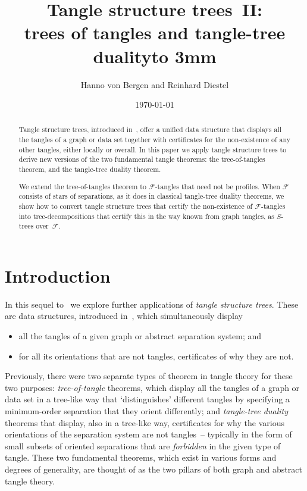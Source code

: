 \documentclass[reqno]{amsart}
\title{Tangle structure trees~II:\\ trees of tangles and tangle-tree duality\hbox to 3mm{\hfil}}
\author{Hanno von Bergen and Reinhard Diestel}
\date{\today}
\newcommand{\F}{\mathcal{F}}
\theoremstyle{definition}
\def\COMMENT{}
\def\td{tree-decom\-pos\-ition}
\begin{document}
\maketitle

\begin{abstract}
Tangle structure trees, introduced in~\cite{TSTs}, offer a unified data structure that displays all the tangles of a graph or data set together with certificates for the non-existence of any other tangles, either locally%
   \COMMENT{}
   or overall. In this paper we apply tangle structure trees to derive new versions of the two fundamental tangle theorems: the tree-of-tangles theorem, and the tangle-tree duality theorem.

We extend the tree-of-tangles theorem to $\F$-tangles that need not be profiles. When $\F$ consists of stars of separations, as it does in classical tangle-tree duality theorems, we show how to convert tangle structure trees that certify the non-existence of $\F$-tangles into \td s that certify this in the way known from graph tangles, as $S$-trees over~$\F$.
\end{abstract}

\medskip\section{Introduction}

\noindent
   In this sequel to~\cite{TSTs} we explore further applications of {\em tangle structure trees\/}. These are data structures, introduced in~\cite{TSTs}, which simultaneously display

\begin{itemize}\itemsep=2pt
\item all the tangles of a given graph or abstract separation system; and

\item for all its orientations%
   \COMMENT{}
   that are not tangles, certificates of why they are not.  
\end{itemize}

\noindent
   Previously, there were two separate types of theorem in tangle theory for these two purposes: {\em tree-of-tangle\/} theorems, which display all the tangles of a graph or data set in a tree-like way that `distinguishes' different tangles by specifying a minimum-order separation that they orient differently; and {\em tangle-tree duality\/} theorems that display, also in a tree-like way, certificates for why the various orientations%
   \COMMENT{}
   of the separation system are not tangles~-- typically in the form of small subsets of oriented separations that are {\em forbidden\/} in the given type of tangle. These two fundamental theorems, which exist in various forms and degrees of generality, are thought of as the two pillars of both graph and abstract tangle theory.
\end{document}
